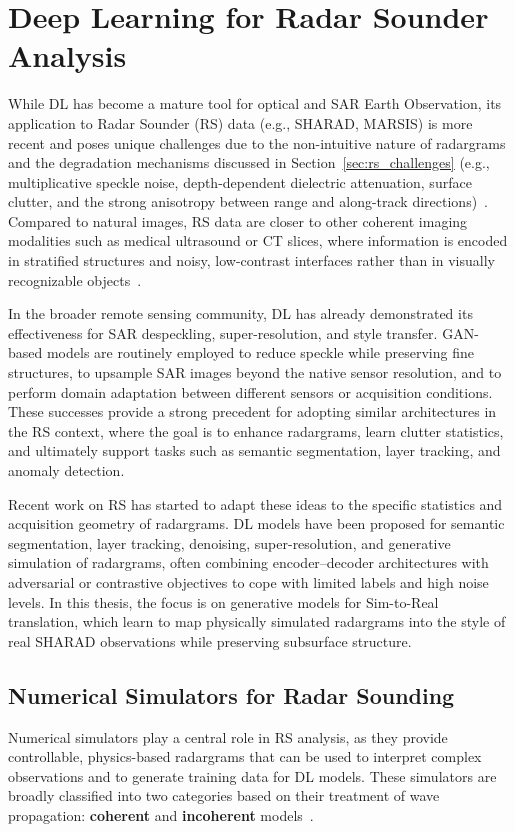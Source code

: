 \section{Deep Learning for Radar Sounder Analysis}
\label{sec:dl_radar}
While DL has become a mature tool for optical and SAR Earth Observation, its application to Radar Sounder (RS) data (e.g., SHARAD, MARSIS) is more recent and poses unique challenges due to the non-intuitive nature of radargrams and the degradation mechanisms discussed in Section~\ref{sec:rs_challenges} (e.g., multiplicative speckle noise, depth-dependent dielectric attenuation, surface clutter, and the strong anisotropy between range and along-track directions)~\cite{Seu_2007,yebasse2025advances}.
Compared to natural images, RS data are closer to other coherent imaging modalities such as medical ultrasound or CT slices, where information is encoded in stratified structures and noisy, low-contrast interfaces rather than in visually recognizable objects~\cite{Daniels_2004,yebasse2025advances}.

In the broader remote sensing community, DL has already demonstrated its effectiveness for SAR despeckling, super-resolution, and style transfer.
GAN-based models are routinely employed to reduce speckle while preserving fine structures, to upsample SAR images beyond the native sensor resolution, and to perform domain adaptation between different sensors or acquisition conditions.
These successes provide a strong precedent for adopting similar architectures in the RS context, where the goal is to enhance radargrams, learn clutter statistics, and ultimately support tasks such as semantic segmentation, layer tracking, and anomaly detection.

Recent work on RS has started to adapt these ideas to the specific statistics and acquisition geometry of radargrams.
DL models have been proposed for semantic segmentation, layer tracking, denoising, super-resolution, and generative simulation of radargrams, often combining encoder–decoder architectures with adversarial or contrastive objectives to cope with limited labels and high noise levels.
In this thesis, the focus is on generative models for Sim-to-Real translation, which learn to map physically simulated radargrams into the style of real SHARAD observations while preserving subsurface structure.

\subsection{Numerical Simulators for Radar Sounding}
Numerical simulators play a central role in RS analysis, as they provide controllable, physics-based radargrams that can be used to interpret complex observations and to generate training data for DL models.
These simulators are broadly classified into two categories based on their treatment of wave propagation: \textbf{coherent} and \textbf{incoherent} models~\cite{Daniels_2004}.


